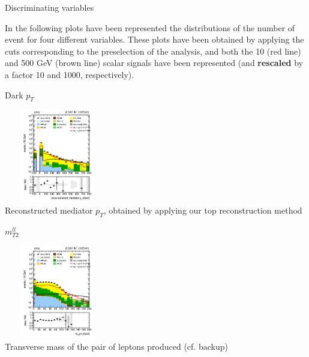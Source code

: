 \documentclass[handout,8 pt]{beamer}
\begin{document}
\begin{frame}{Discriminating variables}

	\justifying
	In the following plots have been represented the distributions of the number of event for four different variables. These plots have been obtained by applying the cuts corresponding to the preselection of the analysis, and both the 10 (red line) and 500 GeV (brown line) scalar signals have been represented (and \textbf{rescaled} by a factor 10 and 1000, respectively). \vfill
	
	\begin{minipage}[c]{.48\linewidth}
	
   	\begin{center}
	\begin{exampleblock}{} { \begin{center} \vspace{1pt} Dark $p_T$ \vspace{1pt} \end{center}} \end{exampleblock} \vspace{5pt}
	\includegraphics[width= 130pt, height= 115pt]{figs/darkpt_log-preSel3.png} \\
	Reconstructed mediator $p_T$, obtained by applying our top reconstruction method
	\end{center}
	
	\end{minipage}
	\hspace{5pt}
	 \begin{minipage}[c]{.48\linewidth}
   	
	\begin{center}
	\begin{exampleblock}{} { \begin{center} $m_{T2}^{ll}$ \end{center}} \end{exampleblock} \vspace{5pt}
	\includegraphics[width= 130pt, height= 115pt]{figs/mt2ll_log-preSel3.png} \\
	Transverse mass of the pair of leptons produced (cf. backup)
	\end{center}
	
	\end{minipage} \vfill

\end{frame}
\end{document}

